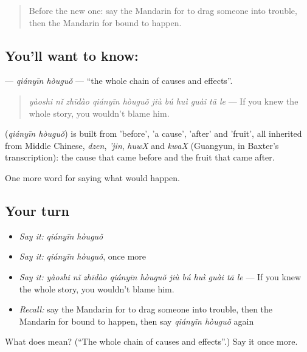 \begin{quote}
Before the new one: say the Mandarin for to drag someone into trouble, then the Mandarin for bound to happen.
\end{quote}

\subsection*{You'll want to know: }
\textbf{} — \emph{qiányīn hòuguǒ} — \textquotedblleft{}the whole chain of causes and effects\textquotedblright{}.

\begin{quote}
\emph{yàoshi nǐ zhīdào qiányīn hòuguǒ jiù bú huì guài tā le} — If you knew the whole story, you wouldn't blame him.
\end{quote}

\begin{cousinweb}
\textbf{} (\emph{qiányīn hòuguǒ}) is built from  'before',  'a cause',  'after' and  'fruit', all inherited from Middle Chinese, \emph{dzen}, \emph{'jin}, \emph{huwX} and \emph{kwaX} (Guangyun, in Baxter's transcription): the cause that came before and the fruit that came after.
\end{cousinweb}

\begin{grammarlens}[title={What you've built}]
One more word for saying what would happen.
\end{grammarlens}

\subsection*{Your turn}
\begin{itemize}
\raggedright
  \item \emph{Say it:} \emph{qiányīn hòuguǒ}
  \item \emph{Say it:} \emph{qiányīn hòuguǒ}, once more
  \item \emph{Say it:} \emph{yàoshi nǐ zhīdào qiányīn hòuguǒ jiù bú huì guài tā le} — If you knew the whole story, you wouldn't blame him.
  \item \emph{Recall:} say the Mandarin for to drag someone into trouble, then the Mandarin for bound to happen, then say \emph{qiányīn hòuguǒ} again
\end{itemize}

\begin{tcolorbox}[breakable,colback=teal!4,colframe=teal!35!black,title={Before you move on}]
What does  mean? (\textquotedblleft{}The whole chain of causes and effects\textquotedblright{}.) Say it once more.
\end{tcolorbox}
